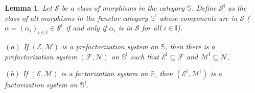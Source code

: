 \documentclass[12pt,a4paper]{amsart}
\newtheorem{lemma}{Lemma}[section]
\theoremstyle{definition}
\begin{document}
\begin{lemma}\label{lemma:uplifting (pre)factsys}
Let $\mathcal{S}$ be a class of morphisms in the category $\mathbb{S}$. Define $\mathcal{S}^\mathbb{I}$ as the class of all morphisms in the functor category $\mathbb{S}^\mathbb{I}$ whose components are in $\mathcal{S}$ ($\alpha=(\alpha_i)_{i\in \mathbb{I}}\in\mathcal{S}^\mathbb{I}$ if and only if $\alpha_i$ is in $\mathcal{S}$ for all $i\in \mathbb{I}$).

$(a)$ If $(\mathcal{E},\mathcal{M})$ is a prefactorization system on $\mathbb{S}$, then there is a prefactorization system $(\mathcal{F},\mathcal{N})$ on $\mathbb{S}^\mathbb{I}$ such that $\mathcal{E}^\mathbb{I}\subseteq\mathcal{F}$ and $\mathcal{M}^\mathbb{I}\subseteq\mathcal{N}$.

$(b)$ If $(\mathcal{E},\mathcal{M})$ is a factorization system on $\mathbb{S}$, then $(\mathcal{E}^\mathbb{I},\mathcal{M}^\mathbb{I})$ is a factorization system on $\mathbb{S}^\mathbb{I}$.
\end{lemma}
\end{document}
